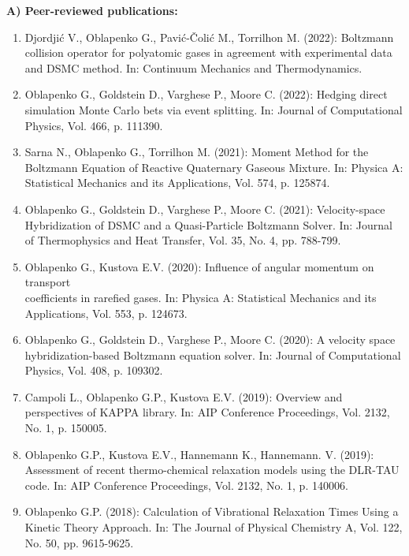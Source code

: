 \documentclass{resume} %
\begin{document}
{\bf A) Peer-reviewed publications:}
\begin{enumerate}

\item Djordji\'c V., Oblapenko G., Pavi\'c-\v Coli\'{c} M., Torrilhon M. (2022): Boltzmann collision operator for polyatomic gases in agreement with experimental data and DSMC method. In: Continuum Mechanics and Thermodynamics.

\item {Oblapenko G.}, Goldstein D., Varghese P., Moore C. (2022): Hedging direct simulation Monte Carlo bets via event splitting. In: Journal of Computational Physics, Vol. 466, p. 111390.

\item Sarna N., Oblapenko G., Torrilhon M. (2021): Moment Method for the Boltzmann Equation of Reactive Quaternary Gaseous Mixture. In: Physica A: Statistical Mechanics and its Applications, Vol. 574, p. 125874.

\item {Oblapenko G.}, Goldstein D., Varghese P., Moore C. (2021): Velocity-space Hybridization of DSMC and a Quasi-Particle Boltzmann Solver. In: Journal of Thermophysics and Heat Transfer, Vol. 35, No. 4, pp. 788-799.

\item {Oblapenko G.}, Kustova E.V. (2020): Influence of angular momentum on transport\\ coefficients in rarefied gases. In: Physica A: Statistical Mechanics and its Applications, Vol. 553, p. 124673.

\item {Oblapenko G.}, Goldstein D., Varghese P., Moore C. (2020): A velocity space hybridization-based Boltzmann equation solver. In: Journal of Computational Physics, Vol. 408, p. 109302.

\item {Campoli L., {Oblapenko G.P.}, Kustova E.V.} (2019): Overview and perspectives of KAPPA library. In: AIP Conference Proceedings, Vol. 2132, No. 1, p. 150005.

\item {{Oblapenko G.P.}, Kustova E.V., Hannemann K., Hannemann. V.} (2019): Assessment of recent thermo-chemical relaxation models using the DLR-TAU code. In: AIP Conference Proceedings, Vol. 2132, No. 1, p. 140006.

\item {{Oblapenko G.P.}} (2018): Calculation of Vibrational Relaxation Times Using a Kinetic Theory Approach. In: The Journal of Physical Chemistry A, Vol. 122, No. 50, pp. 9615-9625.


\end{enumerate}
\end{document}
